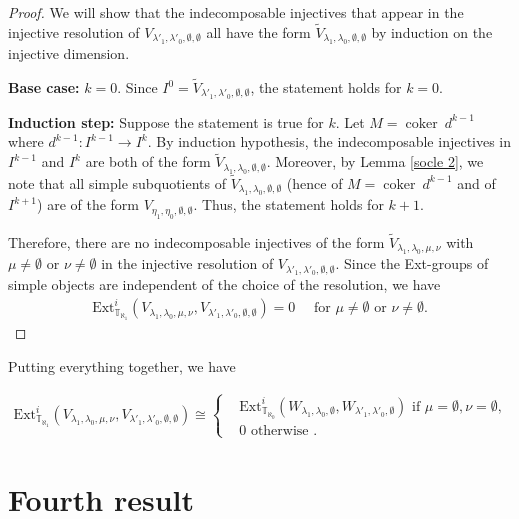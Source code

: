\documentclass[openany, a4paper]{amsbook}
\theoremstyle{definition}
\numberwithin{equation}{chapter}
\newcommand{\T}[1]{{\mathbb{T}}_{\aleph_{#1}}}
\DeclareMathOperator{\coker}{\mathrm{coker}}
\newcommand{\Ext}[4]{\mathrm{Ext}^{#1}_{#2}({#3}, {#4})}
\begin{document}
\begin{proof}
    We will show that the indecomposable injectives that appear in the injective resolution of $V_{\lambda'_1, \lambda'_0, \emptyset, \emptyset}$ all have the form $\tilde{V}_{\lambda_1, \lambda_0, \emptyset, \emptyset}$ by induction on the injective dimension.

    \textbf{Base case:} $k = 0$. Since $I^0 = \tilde{V}_{\lambda'_1, \lambda'_0, \emptyset, \emptyset}$, the statement holds for $k=0$.

    \textbf{Induction step:} Suppose the statement is true for $k$.  Let $M = \coker \  d^{k-1}$ where $d^{k-1}: I^{k-1} \to I^{k}$. By induction hypothesis, the indecomposable injectives in $I^{k-1}$ and $I^{k}$ are both of the form $\tilde{V}_{\lambda_1, \lambda_0, \emptyset, \emptyset}$. Moreover, by Lemma \ref{socle 2}, we note that all simple subquotients of $\tilde{V}_{\lambda_1, \lambda_0, \emptyset, \emptyset}$ (hence of $M = \coker \  d^{k-1}$ and of $I^{k+1}$) are of the form ${V}_{\eta_1, \eta_0, \emptyset, \emptyset}$. Thus, the statement holds for $k+1$.

    Therefore, there are no indecomposable injectives of the form $\tilde{V}_{\lambda_1, \lambda_0, \mu, \nu}$ with $\mu \neq \emptyset$ or $\nu \neq \emptyset$ in the injective resolution of $V_{\lambda'_1, \lambda'_0, \emptyset, \emptyset}$. Since the Ext-groups of simple objects are independent of the choice of the resolution, we have 
    \begin{align*}
        \Ext{i}{\T{1}}{V_{\lambda_1, \lambda_0, \mu, \nu}}{V_{\lambda'_1, \lambda'_0, \emptyset, \emptyset}} = 0 \quad \text{ for } \mu \neq \emptyset \text{ or } \nu \neq \emptyset.
    \end{align*}
\end{proof}

Putting everything together, we have 

\begin{align}
    \Ext{i}{\T{1}}{V_{\lambda_1, \lambda_0, \mu, \nu}}{V_{\lambda'_1, \lambda'_0, \emptyset, \emptyset}} \cong
    \begin{cases}
        & \Ext{i}{\T{0}}{W_{\lambda_1, \lambda_0, \emptyset}}{W_{\lambda'_1, \lambda'_0, \emptyset}} \text{ if } \mu = \emptyset, \nu = \emptyset, \\
        & 0 \text{ otherwise }.
    \end{cases}
\end{align}


\section{Fourth result}
\end{document}
